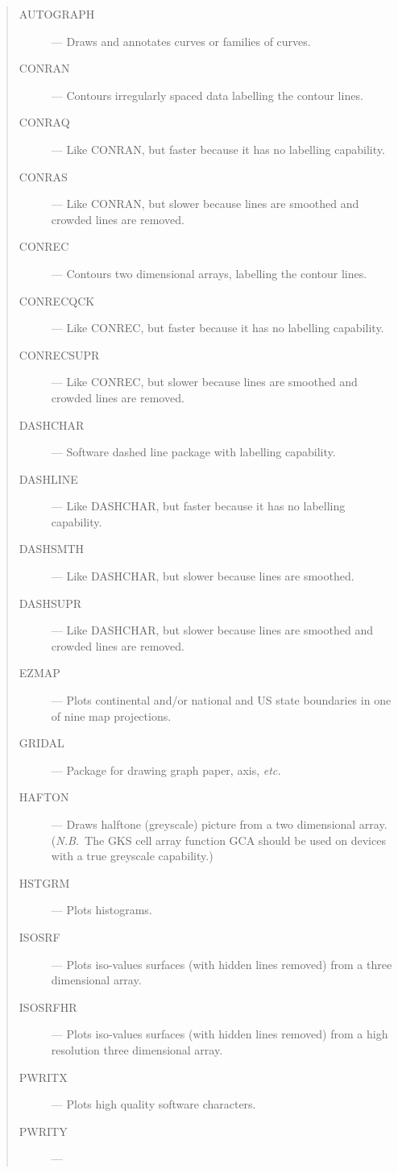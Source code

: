 \documentclass[twoside,11pt]{article}
\renewcommand{\_}{\texttt{\symbol{95}}}
\begin{document}
\begin{quote}
\begin{description}
\item [AUTOGRAPH] ---
 Draws and annotates curves or families of curves.
\item [CONRAN] --- 
 Contours irregularly spaced data labelling the contour lines.
\item [CONRAQ] --- 
 Like CONRAN, but faster because it has no labelling capability.
\item [CONRAS] --- 
 Like CONRAN, but slower because lines are smoothed and crowded lines are
 removed.
\item [CONREC] --- 
 Contours two dimensional arrays, labelling the contour lines.
\item [CONRECQCK] --- 
 Like CONREC, but faster because it has no labelling capability.
\item [CONRECSUPR] --- 
 Like CONREC, but slower because lines are smoothed and crowded lines are
 removed.
\item [DASHCHAR] --- 
 Software dashed line package with labelling capability.
\item [DASHLINE] --- 
 Like DASHCHAR, but faster because it has no labelling capability.
\item [DASHSMTH] --- 
 Like DASHCHAR, but slower because lines are smoothed.
\item [DASHSUPR] --- 
 Like DASHCHAR, but slower because lines are smoothed and crowded lines are
 removed.
\item [EZMAP] --- 
 Plots continental and/or national and US state boundaries in one of nine map
 projections.
\item [GRIDAL] --- 
 Package for drawing graph paper, axis, {\em etc.}
\item [HAFTON] --- 
 Draws halftone (greyscale) picture from a two dimensional array.
 ({\em N.B.}\ The GKS cell array function GCA should be used on devices with a
 true greyscale capability.)
\item [HSTGRM] --- 
 Plots histograms.
\item [ISOSRF] --- 
 Plots iso-values surfaces (with hidden lines removed) from a three
 dimensional array.
\item [ISOSRFHR] --- 
 Plots iso-values surfaces (with hidden lines removed) from a high resolution
 three dimensional array.
\item [PWRITX] --- 
 Plots high quality software characters.                      
\item [PWRITY] --- 

\end{description}
\end{quote}
\end{document}
